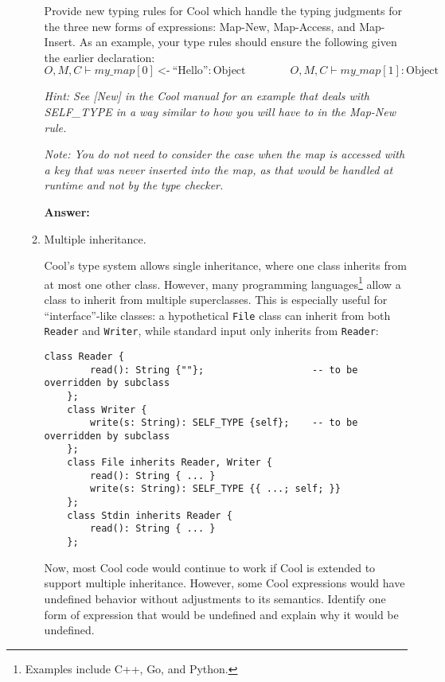 \documentclass[11pt]{article}
\begin{document}
\begin{enumerate}
\begin{enumerate}
    Provide new typing rules for Cool which handle the typing judgments for the three new forms of expressions: Map-New,
    Map-Access, and Map-Insert. As an example, your type rules should ensure the following given the earlier declaration:
    \[
        O, M, C \vdash \mathit{my\_map}[0]\ \texttt{<-}\ \text{``Hello''} : \mathrm{Object} \qquad\qquad
        O, M, C \vdash \mathit{my\_map}[1] : \mathrm{Object}
    \]

    \emph{Hint: See [New] in the Cool manual for an example that deals with SELF\_TYPE in a way similar to how you will have to
    in the Map-New rule.}

    \emph{Note: You do not need to consider the case when the map is accessed with a key that was never inserted into the map,
    as that would be handled at runtime and not by the type checker.}

    \bigskip

    \begin{minipage}{\textwidth}
    \textbf{Answer:}
    \vspace{7cm}
    \end{minipage}
    \newpage
    \item Multiple inheritance.

    Cool's type system allows single inheritance, where one class inherits from
    at most one other class. However, many programming
    languages\footnote{Examples include C++, Go, and Python.} allow a class to
    inherit from multiple superclasses. This is especially useful for
    ``interface''-like classes: a hypothetical \texttt{File} class can inherit
    from both \texttt{Reader} and \texttt{Writer}, while standard input only
    inherits from \texttt{Reader}:
    \begin{lstlisting}[gobble=4, emph={s}, basicstyle=\small]
    class Reader {
        read(): String {""};                   -- to be overridden by subclass
    };
    class Writer {
        write(s: String): SELF_TYPE {self};    -- to be overridden by subclass
    };
    class File inherits Reader, Writer {
        read(): String { ... }
        write(s: String): SELF_TYPE {{ ...; self; }}
    };
    class Stdin inherits Reader {
        read(): String { ... }
    };
    \end{lstlisting}

    Now, most Cool code would continue to work if Cool is extended to support
    multiple inheritance. However, some Cool expressions would have
    undefined behavior without adjustments to its semantics. Identify one
    form of expression that would be undefined and explain why it would be
    undefined.


\end{enumerate}
\end{enumerate}
\end{document}
